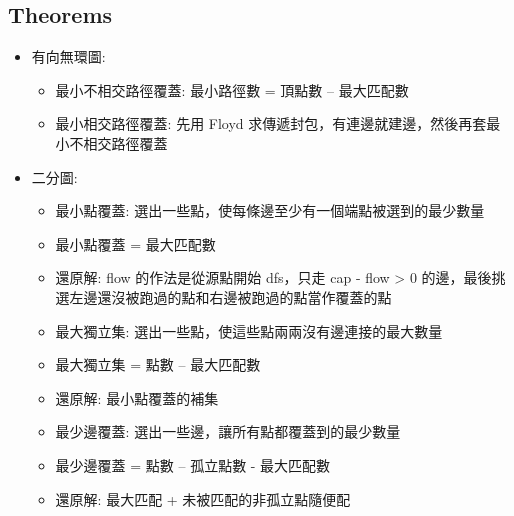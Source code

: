 \subsection{Theorems}
\begin{itemize}
\item 有向無環圖:
	\begin{itemize}
		\item 最小不相交路徑覆蓋: 最小路徑數 = 頂點數 – 最大匹配數
		\item 最小相交路徑覆蓋: 先用 Floyd 求傳遞封包，有連邊就建邊，然後再套最小不相交路徑覆蓋
	\end{itemize}
\item 二分圖:
	\begin{itemize}
		\item 最小點覆蓋: 選出一些點，使每條邊至少有一個端點被選到的最少數量
		\item 最小點覆蓋 = 最大匹配數
		\item 還原解: flow 的作法是從源點開始 dfs，只走 cap - flow > 0 的邊，最後挑選左邊還沒被跑過的點和右邊被跑過的點當作覆蓋的點
	\end{itemize}
	\begin{itemize}
		\item 最大獨立集: 選出一些點，使這些點兩兩沒有邊連接的最大數量
		\item 最大獨立集 = 點數 – 最大匹配數
		\item 還原解: 最小點覆蓋的補集
	\end{itemize}
	\begin{itemize}
		\item 最少邊覆蓋: 選出一些邊，讓所有點都覆蓋到的最少數量
		\item 最少邊覆蓋 = 點數 – 孤立點數 - 最大匹配數
		\item 還原解: 最大匹配 + 未被匹配的非孤立點隨便配
	\end{itemize}
\end{itemize}